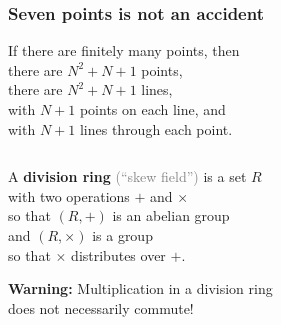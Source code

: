 \documentclass[14pt]{chalkfjord}
\begin{document}
\begin{frame}
  \frametitle{Seven points is not an accident}

  \begin{theorem}
    If there are finitely many points, then \\
    \quad there are $N^2 + N + 1$ points, \\
    \quad there are $N^2 + N + 1$ lines, \\
    \quad with $N+1$ points on each line, and \\
    \quad with $N+1$ lines through each point. \\    
  \end{theorem}
  \pause
  
    \begin{center}
    \begin{columns}
      \begin{column}{0.4\textwidth}
      \end{column}
      \begin{column}{0.4\textwidth}
      \end{column}
    \end{columns}
    \end{center}

\end{frame}

\begin{frame}
  \begin{definition}
    A \textbf{division ring} \textcolor{gray}{(``skew field'')} is a set $R$ \\
    \quad with two operations $+$ and $\times$ \\
    \quad so that $(R,+)$ is an abelian group \\
    \quad and $(R,\times)$ is a group \\
    \quad\quad so that $\times$ distributes over $+$.
  \end{definition}

  \vfill
  \pause
  \textbf{Warning:} Multiplication in a division ring \\
  \quad does not necessarily commute!
\end{frame}
\end{document}
